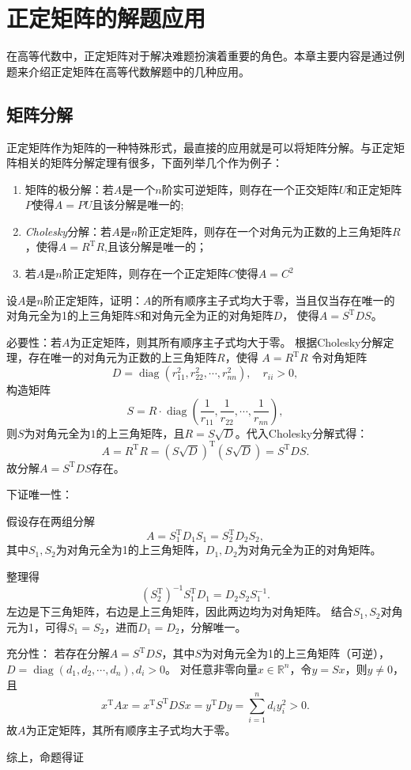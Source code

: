 
\large{}
\chapter{正定矩阵的解题应用}\label{sec_si4}
在高等代数中，正定矩阵对于解决难题扮演着重要的角色。本章主要内容是通过例题来介绍正定矩阵在高等代数解题中的几种应用。
\section{矩阵分解}
正定矩阵作为矩阵的一种特殊形式，最直接的应用就是可以将矩阵分解。与正定矩阵相关的矩阵分解定理有很多，下面列举几个作为例子：
\begin{enumerate}
    \item 矩阵的极分解：若$A$是一个$n$阶实可逆矩阵，则存在一个正交矩阵$U$和正定矩阵$P$使得$A=PU$且该分解是唯一的;
    \item \textit{Cholesky}分解：若$A$是$n$阶正定矩阵，则存在一个对角元为正数的上三角矩阵$R$，使得$A=R^\mathrm{T}R$,且该分解是唯一的；
    \item 若$A$是$n$阶正定矩阵，则存在一个正定矩阵$C$使得$A=C^2$
\end{enumerate}
\begin{example}
    设$A$是$n$阶正定矩阵，证明：$A$的所有顺序主子式均大于零，当且仅当存在唯一的对角元全为1的上三角矩阵$S$和对角元全为正的对角矩阵$D$，
    使得$A = S^\mathrm{T} D S$。
\end{example}
\begin{solution}
必要性：若$A$为正定矩阵，则其所有顺序主子式均大于零。
根据Cholesky分解定理，存在唯一的对角元为正数的上三角矩阵$R$，使得
$A = R^\mathrm{T}R$
令对角矩阵
$$D = \operatorname{diag}(r_{11}^2, r_{22}^2, \cdots, r_{nn}^2), \quad r_{ii}>0,$$
构造矩阵
$$S = R \cdot \operatorname{diag}\left(\frac{1}{r_{11}}, \frac{1}{r_{22}}, \cdots, \frac{1}{r_{nn}}\right),$$
则$S$为对角元全为$1$的上三角矩阵，且$R = S\sqrt{D}$。代入Cholesky分解式得：
$$
A = R^\mathrm{T} R = (S\sqrt{D})^\mathrm{T} (S\sqrt{D}) = S^\mathrm{T} D S.
$$
故分解$A = S^\mathrm{T} D S$存在。

下证唯一性：

假设存在两组分解$$A = S_1^\mathrm{T} D_1 S_1 = S_2^\mathrm{T} D_2 S_2,$$
其中$S_1,S_2$为对角元全为1的上三角矩阵，$D_1,D_2$为对角元全为正的对角矩阵。

整理得$$(S_2^\mathrm{T})^{-1}S_1^\mathrm{T} D_1 = D_2 S_2 S_1^{-1}.$$
左边是下三角矩阵，右边是上三角矩阵，因此两边均为对角矩阵。
结合$S_1,S_2$对角元为1，可得$S_1 = S_2$，进而$D_1 = D_2$，分解唯一。

充分性：
若存在分解$A = S^\mathrm{T} D S$，其中$S$为对角元全为1的上三角矩阵（可逆），$D = \operatorname{diag}(d_1,d_2,\cdots,d_n),d_i>0$。
对任意非零向量$x \in \mathbb{R}^n$，令$y = Sx$，则$y \neq 0$，且
$$
x^\mathrm{T} A x = x^\mathrm{T} S^\mathrm{T} D S x = y^\mathrm{T} D y = \sum_{i=1}^n d_i y_i^2 > 0.
$$
故$A$为正定矩阵，其所有顺序主子式均大于零。

综上，命题得证
\end{solution}

